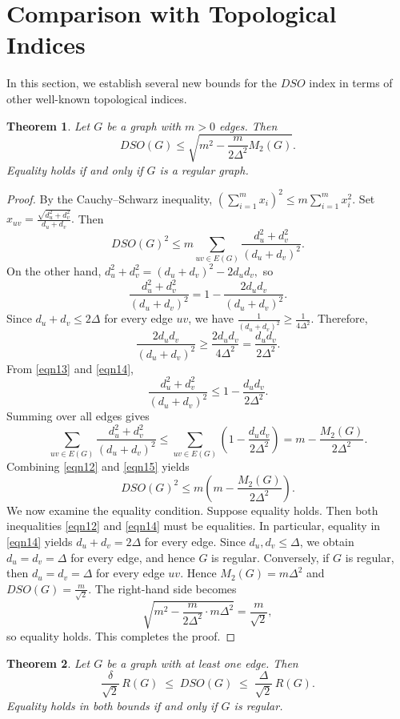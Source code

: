 \documentclass{article}
\newtheorem{theorem}{Theorem}
\theoremstyle{definition}
\begin{document}
\section{Comparison with Topological Indices}

In this section, we establish several new bounds for the $DSO$ index in terms of other well-known topological indices.


\begin{theorem}\label{DSO-M2-Delta}
Let $G$ be a  graph with $m>0$ edges. Then
\[
DSO(G)\le \sqrt{m^2-\frac{m}{2\Delta^2} M_2(G)}.
\]
Equality holds if and only if $G$ is a regular graph.
\end{theorem}

\begin{proof}
By the Cauchy–Schwarz inequality,
$
\left(\sum_{i=1}^m x_i\right)^2 \le m\sum_{i=1}^m x_i^2.
$
Set
$x_{uv}=\frac{\sqrt{d_u^2+d_v^2}}{d_u+d_v}.
$
Then
\begin{equation}\label{eqn12}
DSO(G)^2
\le 
m\sum_{uv\in E(G)} \frac{d_u^2+d_v^2}{(d_u+d_v)^2}.
\end{equation}
On the other hand,
$
d_u^2+d_v^2=(d_u+d_v)^2-2d_u d_v,
$
so
\begin{equation}\label{eqn13}
\frac{d_u^2+d_v^2}{(d_u+d_v)^2}
=1-\frac{2d_u d_v}{(d_u+d_v)^2}. 
\end{equation}
Since $d_u+d_v\le 2\Delta$ for every edge $uv$, we have $\frac{1}{(d_u+d_v)^2} \ge \frac{1}{4\Delta^2}$. Therefore,
\begin{equation}\label{eqn14}
\frac{2d_u d_v}{(d_u+d_v)^2}
\ge \frac{2d_u d_v}{4\Delta^2}
= \frac{d_u d_v}{2\Delta^2}. 
\end{equation}
From \eqref{eqn13} and \eqref{eqn14},
\[
\frac{d_u^2+d_v^2}{(d_u+d_v)^2}
\le 1-\frac{d_u d_v}{2\Delta^2}.
\]
Summing over all edges gives
\begin{equation}\label{eqn15}
\sum_{uv\in E(G)} \frac{d_u^2+d_v^2}{(d_u+d_v)^2}
\le 
\sum_{uv\in E(G)} \left(1-\frac{d_u d_v}{2\Delta^2}\right)
=
m-\frac{M_2(G)}{2\Delta^2}.
\end{equation}
Combining \eqref{eqn12} and \eqref{eqn15} yields
\[
DSO(G)^2 \le m\left(m-\frac{M_2(G)}{2\Delta^2}\right).
\]
We now examine the equality condition.
Suppose equality holds.
Then both inequalities \eqref{eqn12} and \eqref{eqn14}
must be equalities.
In particular, equality in \eqref{eqn14} yields
$d_u+d_v=2\Delta$ for every edge.
Since $d_u,d_v\le\Delta$, we obtain
$d_u=d_v=\Delta$ for every edge,
and hence $G$ is regular.
Conversely, if $G$ is regular, then  $d_u=d_v=\Delta$  for every edge $uv$. Hence $M_2(G)=m\Delta^2$ and $DSO(G)=\frac{m}{\sqrt{2}}$. The right-hand side becomes
\[
\sqrt{m^2-\frac{m}{2\Delta^2} \cdot m\Delta^2}
=
\frac{m}{\sqrt{2}},
\]
so equality holds. This completes the proof.
\end{proof}
\begin{theorem}\label{DSO-R}
Let $G$ be a graph with at least one edge.
Then
\[
\frac{\delta}{\sqrt{2}}\,R(G) \;\le\; DSO(G) \;\le\; \frac{\Delta}{\sqrt{2}}\,R(G).
\]
Equality holds in both bounds if and only if $G$ is regular.
\end{theorem}
\end{document}
